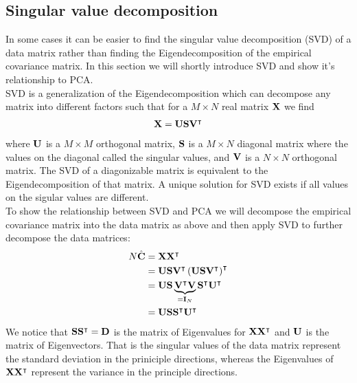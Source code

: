 \subsection{Singular value decomposition}
In some cases it can be easier to find the singular value decomposition (SVD) of a data matrix
rather than finding the Eigendecomposition of the empirical covariance matrix. In this section
we will shortly introduce SVD and show it's relationship to PCA.\\
SVD is a generalization of the Eigendecomposition which can decompose any matrix into different 
factors such that for a $M \times N$ real matrix $\mathbf{X}$ we find
\begin{align}
	\mathbf{X} = \mathbf{U S V^\intercal}
\end{align}
where $\mathbf{U}$ is a $M \times M$ orthogonal matrix, $\mathbf{S}$ is a $M \times N$  diagonal matrix
where the values on the diagonal called the singular values, and $\mathbf{V}$ is a $N \times N$ 
orthogonal matrix. The SVD of a diagonizable matrix is equivalent to the Eigendecomposition 
of that matrix. A unique solution for SVD exists if all values on the sigular values are different. \\

\noindent To show the relationship between SVD and PCA we will decompose the empirical covariance matrix
into the data matrix as above and then apply SVD to further decompose the data matrices:
\begin{align}
	\begin{split}
	N \hat{\mathbf{C}} &= \mathbf{X X ^\intercal} \\
	               &= \mathbf{U S V^\intercal} \left( \mathbf{U S V^\intercal} \right)^\intercal \\
   	               &= \mathbf{U S} \underbrace{\mathbf{V^\intercal V}}_{= \operatorname{\mathbf{I}}_N} \mathbf{S^\intercal U^\intercal}\\
   	               &= \mathbf{U S S^\intercal U^\intercal}\\
	\end{split}
\end{align}
\noindent We notice that $\mathbf{S S^\intercal} = \mathbf{D}$ is the matrix of Eigenvalues for $\mathbf{X X^\intercal}$ and
$\mathbf{U}$ is the matrix of Eigenvectors. That is the singular values of the data matrix represent 
the standard deviation in the priniciple directions, whereas the Eigenvalues of $\mathbf{X X^\intercal}$ 
represent the variance in the principle directions.

